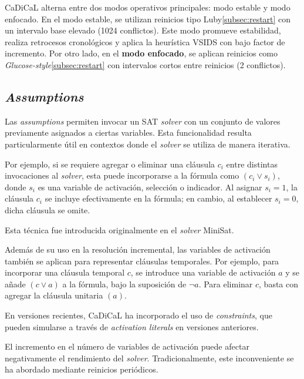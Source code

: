 CaDiCaL alterna entre dos modos operativos principales: modo estable y modo enfocado. En el modo estable, se utilizan reinicios tipo Luby\ref{subsec:restart} con un intervalo base elevado (1024 conflictos). Este modo promueve estabilidad, realiza retrocesos cronológicos y aplica la heurística VSIDS con bajo factor de incremento. Por otro lado, en el \textbf{modo enfocado}, se aplican reinicios como \textit{Glucose-style}\ref{subsec:restart} con intervalos cortos entre reinicios (2 conflictos).

\subsection{\textit{Assumptions}}
\label{subsec:cadical-assumptions}

Las \textit{assumptions} permiten invocar un SAT \textit{solver} con un conjunto de valores previamente asignados a ciertas variables. Esta funcionalidad resulta particularmente útil en contextos donde el \textit{solver} se utiliza de manera iterativa.

Por ejemplo, si se requiere agregar o eliminar una cláusula $c_i$ entre distintas invocaciones al \textit{solver}, esta puede incorporarse a la fórmula como $(c_i \lor s_i)$, donde $s_i$ es una variable de activación, selección o indicador. Al asignar $s_i = 1$, la cláusula $c_i$ se incluye efectivamente en la fórmula; en cambio, al establecer $s_i = 0$, dicha cláusula se omite.

Esta técnica fue introducida originalmente en el \textit{solver} MiniSat. %

Además de su uso en la resolución incremental, las variables de activación también se aplican para representar cláusulas temporales. Por ejemplo, para incorporar una cláusula temporal $c$, se introduce una variable de activación $a$ y se añade $(c \lor a)$ a la fórmula, bajo la suposición de $\neg a$. Para eliminar $c$, basta con agregar la cláusula unitaria $(a)$.

En versiones recientes, CaDiCaL ha incorporado el uso de \textit{constraints}, que pueden simularse a través de \textit{activation literals} en versiones anteriores. %

El incremento en el número de variables de activación puede afectar negativamente el rendimiento del \textit{solver}. Tradicionalmente, este inconveniente se ha abordado mediante reinicios periódicos. %

